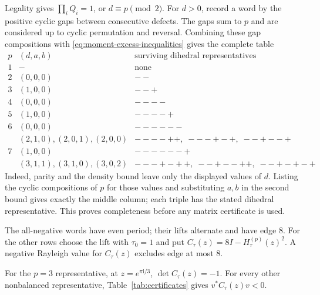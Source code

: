 Legality gives $\prod_iQ_i=1$, or $d\equiv p\pmod2$.  For $d>0$, record a
word by the positive cyclic gaps between consecutive defects.  The gaps sum
to $p$ and are considered up to cyclic permutation and reversal.  Combining
these gap compositions with \eqref{eq:moment-excess-inequalities} gives the
complete table
\begin{equation}
\begin{array}{c|c|l}
p&(d,a,b)&\text{surviving dihedral representatives}\\ \hline
1&-&\text{none}\\
2&(0,0,0)&--\\
3&(1,0,0)&--+\\
4&(0,0,0)&----\\
5&(1,0,0)&----+\\
6&(0,0,0)&------\\
 &(2,1,0),(2,0,1),(2,0,0)&----++,\;---+-+,\;--+--+\\
7&(1,0,0)&------+\\
 &(3,1,1),(3,1,0),(3,0,2)&---+-++,\;--+--++,\;--+-+-+
\end{array}
\label{eq:short-survivors}
\end{equation}
Indeed, parity and the density bound leave only the displayed values of $d$.
Listing the cyclic compositions of $p$ for those values and substituting
$a,b$ in the second bound gives exactly the middle column; each triple has the
stated dihedral representative.  This proves completeness before any matrix
certificate is used.

The all-negative words have even period; their lifts alternate and have edge
$8$.  For the other rows choose the lift with $\tau_0=1$ and put
$C_\tau(z)=8I-H_\tau^{(p)}(z)^2$.  A negative Rayleigh value for $C_\tau(z)$
excludes edge at most $8$.

\begin{lemma}
\label{lem:short-certificates}
For the $p=3$ representative, at $z=e^{\pi\mathrm i/3}$,
$\det C_\tau(z)=-1$.  For every other nonbalanced representative,
Table~\ref{tab:certificates} gives $v^*C_\tau(z)v<0$.
\end{lemma}

